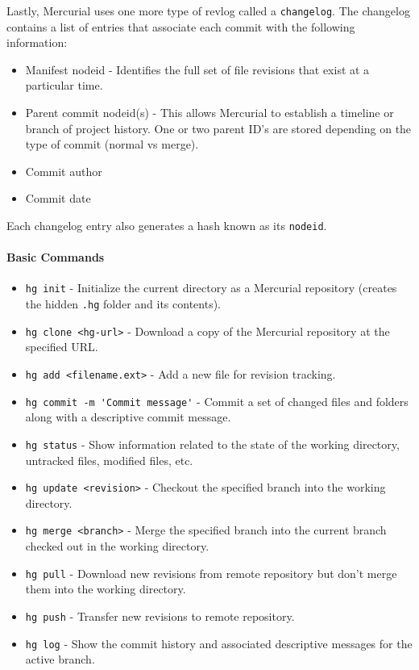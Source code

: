 Lastly, Mercurial uses one more type of revlog called a \lstinline{changelog}. The changelog contains a list of entries that associate each commit with the following information:
\begin{itemize}
    \item Manifest nodeid - Identifies the full set of file revisions that exist at a particular time.
    \item Parent commit nodeid(s) - This allows Mercurial to establish a timeline or branch of project history. One or two parent ID's are stored depending on the type of commit (normal vs merge).
    \item Commit author
    \item Commit date
\end{itemize}
Each changelog entry also generates a hash known as its \lstinline{nodeid}.

\paragraph{Basic Commands}
\begin{itemize}
    \item \lstinline{hg init} - Initialize the current directory as a Mercurial repository (creates the hidden \lstinline{.hg} folder and its contents).
    \item \lstinline{hg clone <hg-url>} - Download a copy of the Mercurial repository at the specified URL.
    \item \lstinline{hg add <filename.ext>} - Add a new file for revision tracking.
    \item \lstinline{hg commit -m 'Commit message'} - Commit a set of changed files and folders along with a descriptive commit message.
    \item \lstinline{hg status} - Show information related to the state of the working directory, untracked files, modified files, etc.
    \item \lstinline{hg update <revision>} - Checkout the specified branch into the working directory.
    \item \lstinline{hg merge <branch>} - Merge the specified branch into the current branch checked out in the working directory.
    \item \lstinline{hg pull} - Download new revisions from remote repository but don't merge them into the working directory.
    \item \lstinline{hg push} - Transfer new revisions to remote repository.
    \item \lstinline{hg log} - Show the commit history and associated descriptive messages for the active branch.
\end{itemize}


